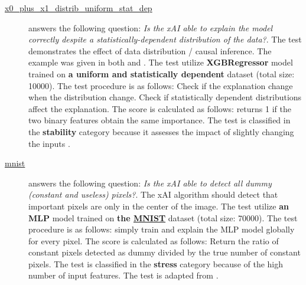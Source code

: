 \begin{description}
\item[\href{https://github.com/Karim-53/Compare-xAI/tree/main/tests/x0_plus_x1.py}{x0\_plus\_x1\_distrib\_uniform\_stat\_dep}] answers the following question: \emph{Is the xAI able to explain the model correctly despite a statistically-dependent distribution of the data?}.
The test demonstrates the effect of data distribution / causal inference. The example was given in both \citep{hooker2021unrestricted} and \citep{janzing2020feature}.
 The test utilize \textbf{XGBRegressor} model trained on \textbf{a uniform and statistically dependent} dataset (total size: 10000).
 The test procedure is as follows: Check if the explanation change when the distribution change. Check if statistically dependent distributions affect the explanation.
 The score is calculated as follows: returns 1 if the two binary features obtain the same importance.
 The test is classified in the \textbf{stability} category because it assesses the impact of slightly changing the inputs \citep{janzing2020feature}.


\item[\href{https://github.com/Karim-53/Compare-xAI/tree/main/tests/mnist.py}{mnist}] answers the following question: \emph{Is the xAI able to detect all dummy (constant and useless) pixels?}.
The xAI algorithm should detect that important pixels are only in the center of the image.
 The test utilize \textbf{an MLP} model trained on \textbf{the \href{https://www.openml.org/d/554}{MNIST}} dataset (total size: 70000).
 The test procedure is as follows: simply train and explain the MLP model globally for every pixel.
 The score is calculated as follows: Return the ratio of constant pixels detected as dummy divided by the true number of constant pixels.
 The test is classified in the \textbf{stress} category because of the high number of input features. The test is adapted from \citep{covert2020understanding}.



\end{description}
